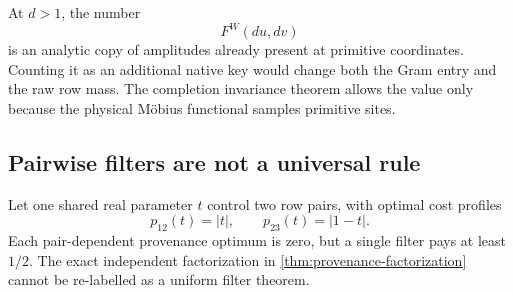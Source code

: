 At \(d>1\), the number
\[
 F^W(du,dv)
\]
is an analytic copy of amplitudes already present at primitive
coordinates.  Counting it as an additional native key would change both
the Gram entry and the raw row mass.  The completion invariance theorem
allows the value only because the physical M\"obius functional samples
primitive sites.

\subsection{Pairwise filters are not a universal rule}

Let one shared real parameter \(t\) control two row pairs, with optimal
cost profiles
\[
 p_{12}(t)=|t|,
 \qquad
 p_{23}(t)=|1-t|.
\]
Each pair-dependent provenance optimum is zero, but a single filter pays
at least \(1/2\).  The exact independent factorization in
\cref{thm:provenance-factorization} cannot be re-labelled as a uniform
filter theorem.
